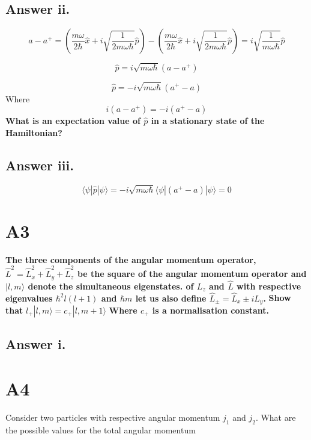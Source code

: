 \documentclass[12pt]{article}
\begin{document}
\subsection*{Answer ii.}
\begin{equation}
\label{eq:com3}
a-a^{+}= \left(\frac{m\omega}{2\hbar}\hat{x}+i\sqrt{\frac{1}{2m\omega\hbar}}\hat{p}\right)-
\left(\frac{m\omega}{2\hbar}\hat{x}+i\sqrt{\frac{1}{2m\omega\hbar}}\hat{p}\right)=i\sqrt{\frac{1}{m\omega\hbar}}\hat{p}
\end{equation}

\begin{equation}
\label{eq:sol2}
\hat{p}=i \sqrt{m \omega \hbar } (a-a^{+})
\end{equation}


\begin{equation}
\label{eq:sol3}
\hat{p}=-i \sqrt{m \omega \hbar } (a^{+}-a)
\end{equation}
\noindent
Where $$i(a-a^{+})=-i(a^{+}-a)$$
\noindent
\textbf{What is an expectation value of $\hat{p}$ in a stationary state of the Hamiltonian?}

\subsection*{Answer iii.}
\begin{equation}
\label{eq:expect}
\langle \psi | \hat{p} | \psi \rangle = -i \sqrt{m \omega \hbar } \langle \psi | (a^{+}-a) | \psi \rangle  = 0 
\end{equation}
\clearpage
\section*{A3}
\textbf{The three components of the angular momentum operator,
 $\hat{L}^{2}=\hat{L}^{2}_{x}+\hat{L}^{2}_{y}+\hat{L}^{2}_{z}$ be the square of the angular momentum operator and $| l,m\rangle$ denote the simultaneous 
 eigenstates. of $L_{z}$ and $\hat{L}$ with respective eigenvalues $\hbar^{2}l(l+1)$ and $\hbar m$ let us also define
  $\hat{L}_{\pm}=\hat{L}_{x}\pm i L_{y}$. }
  \noindent
\textbf{Show that }
 $l_{+} | l,m\rangle=c_{+} | l,m+1\rangle$ \textbf{Where $c_{+}$ is a normalisation constant.}
 
 \subsection*{Answer i.}
 
 \clearpage 
 \section*{A4}
 Consider two particles with respective angular momentum $j_{1}$ and $j_{2}$. What are the possible values for the total angular momentum 
\end{document}
